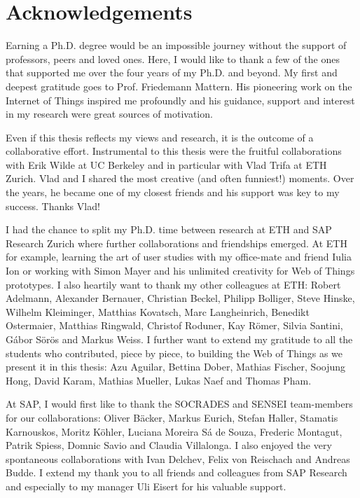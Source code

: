 \chapter*{Acknowledgements}
Earning a Ph.D. degree would be an impossible journey without the support of professors, peers and loved ones. Here, I would like to thank a few of the ones that supported me over the four years of my Ph.D. and beyond. My first and deepest gratitude goes to Prof. Friedemann Mattern. His pioneering work on the Internet of Things inspired me profoundly and his guidance, support and interest in my research were great sources of motivation.

Even if this thesis reflects my views and research, it is the outcome of a collaborative effort. Instrumental to this thesis were the fruitful collaborations with Erik Wilde at UC Berkeley and in particular with Vlad Trifa at ETH Zurich. Vlad and I shared the most creative (and often funniest!) moments. Over the years, he became one of my closest friends and his support was key to my success. Thanks Vlad! 

I had the chance to split my Ph.D. time between research at ETH and SAP Research Zurich where further collaborations and friendships emerged. At ETH for example, learning the art of user studies with my office-mate and friend Iulia Ion or working with Simon Mayer and his unlimited creativity for Web of Things prototypes. I also heartily want to thank my other colleagues at ETH: Robert Adelmann, Alexander Bernauer, Christian Beckel, Philipp Bolliger, Steve Hinske, Wilhelm Kleiminger, Matthias Kovatsch, Marc Langheinrich, Benedikt Ostermaier, Matthias Ringwald, Christof Roduner, Kay R\"{o}mer, Silvia Santini, G\'{a}bor S\"{o}r\"{o}s and Markus Weiss. I further want to extend my gratitude to all the students who contributed, piece by piece, to building the Web of Things as we present it in this thesis: Azu Aguilar, Bettina Dober, Mathias Fischer, Soojung Hong, David Karam, Mathias Mueller, Lukas Naef and Thomas Pham.

At SAP, I would first like to thank the SOCRADES and SENSEI team-members for our collaborations: Oliver B\"{a}cker, Markus Eurich, Stefan Haller, Stamatis Karnouskos, Moritz K\"{o}hler, Luciana Moreira S\'{a} de Souza, Frederic Montagut, Patrik Spiess, Domnic Savio and Claudia Villalonga. I also enjoyed the very spontaneous collaborations with Ivan Delchev, Felix von Reischach and Andreas Budde. I extend my thank you to all friends and colleagues from SAP Research and especially to my manager Uli Eisert for his valuable support.

